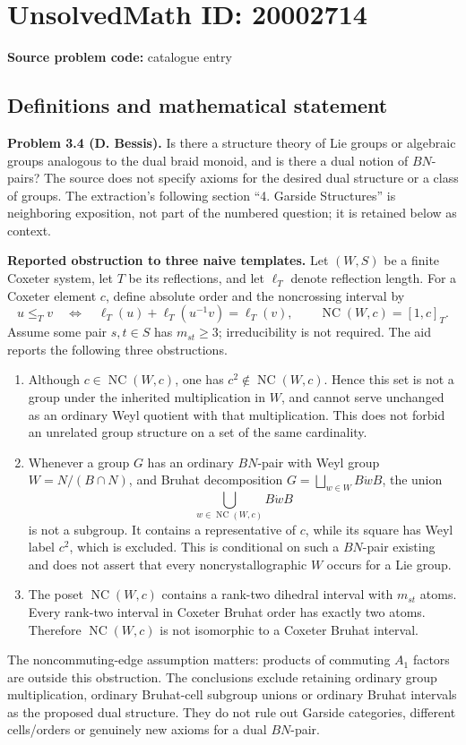 \documentclass[11pt]{article}
\begin{document}
\section*{UnsolvedMath ID: 20002714}
\textbf{Source problem code:} catalogue entry
\subsection{Definitions and mathematical statement}
\textbf{Problem 3.4 (D. Bessis).} Is there a structure theory of Lie groups or algebraic groups analogous to the dual braid monoid, and is there a dual notion of \(BN\)-pairs? The source does not specify axioms for the desired dual structure or a class of groups. The extraction's following section ``4. Garside Structures'' is neighboring exposition, not part of the numbered question; it is retained below as context.

\textbf{Reported obstruction to three naive templates.} Let \((W,S)\) be a finite Coxeter system, let \(T\) be its reflections, and let \(\ell_T\) denote reflection length. For a Coxeter element \(c\), define absolute order and the noncrossing interval by
\[
 u\leq_Tv\quad\Longleftrightarrow\quad
 \ell_T(u)+\ell_T(u^{-1}v)=\ell_T(v),\qquad
 \operatorname{NC}(W,c)=[1,c]_T.
\]
Assume some pair \(s,t\in S\) has \(m_{st}\geq3\); irreducibility is not required. The aid reports the following three obstructions.
\begin{enumerate}
\item Although \(c\in\operatorname{NC}(W,c)\), one has \(c^2\notin\operatorname{NC}(W,c)\). Hence this set is not a group under the inherited multiplication in \(W\), and cannot serve unchanged as an ordinary Weyl quotient with that multiplication. This does not forbid an unrelated group structure on a set of the same cardinality.
\item Whenever a group \(G\) has an ordinary \(BN\)-pair with Weyl group \(W=N/(B\cap N)\), and Bruhat decomposition \(G=\bigsqcup_{w\in W}B\dot wB\), the union
\[
 \bigcup_{w\in\operatorname{NC}(W,c)}B\dot wB
\]
is not a subgroup. It contains a representative of \(c\), while its square has Weyl label \(c^2\), which is excluded. This is conditional on such a \(BN\)-pair existing and does not assert that every noncrystallographic \(W\) occurs for a Lie group.
\item The poset \(\operatorname{NC}(W,c)\) contains a rank-two dihedral interval with \(m_{st}\) atoms. Every rank-two interval in Coxeter Bruhat order has exactly two atoms. Therefore \(\operatorname{NC}(W,c)\) is not isomorphic to a Coxeter Bruhat interval.
\end{enumerate}
The noncommuting-edge assumption matters: products of commuting \(A_1\) factors are outside this obstruction. The conclusions exclude retaining ordinary group multiplication, ordinary Bruhat-cell subgroup unions or ordinary Bruhat intervals as the proposed dual structure. They do not rule out Garside categories, different cells/orders or genuinely new axioms for a dual \(BN\)-pair.
\end{document}
